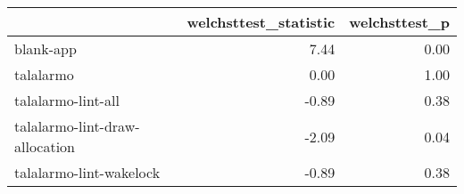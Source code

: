\begin{tabular}{lrr}
\toprule
{} &  welchsttest\_statistic &  welchsttest\_p \\
\midrule
blank-app                      &                   7.44 &           0.00 \\
talalarmo                      &                   0.00 &           1.00 \\
talalarmo-lint-all             &                  -0.89 &           0.38 \\
talalarmo-lint-draw-allocation &                  -2.09 &           0.04 \\
talalarmo-lint-wakelock        &                  -0.89 &           0.38 \\
\bottomrule
\end{tabular}

